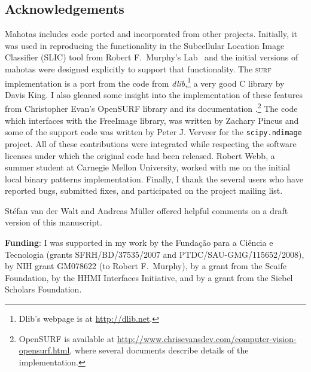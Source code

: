 \documentclass{scrartcl}
\newcommand*{\cpp}{{C\nolinebreak[4]\hspace{-.05em}\raisebox{.4ex}{\tiny\textbf{++}}}}
\let\code\texttt
\begin{document}
\subsection*{Acknowledgements}

Mahotas includes code ported and incorporated from other projects. Initially,
it was used in reproducing the functionality in the Subcellular Location Image
Classifier (SLIC) tool from Robert F.\ Murphy's
Lab~\citep{springerlink:10.1007/978-0-387-45524-2_47} and the initial versions
of mahotas were designed explicitly to support that functionality. The
\textsc{surf} implementation is a port from the code from
\textit{dlib},\footnote{Dlib's webpage is at \url{http://dlib.net}.} a very
good \cpp{} library by Davis King. I also gleaned some insight into the
implementation of these features from Christopher Evan's OpenSURF library and
its documentation \citep{evans2009}.\footnote{OpenSURF is available at
\url{http://www.chrisevansdev.com/computer-vision-opensurf.html}, where several
documents describe details of the implementation.} The code which interfaces
with the FreeImage library, was written by Zachary Pincus and some of the
support code was written by Peter J. Verveer for the \code{scipy.ndimage}
project. All of these contributions were integrated while respecting the
software licenses under which the original code had been released. Robert Webb,
a summer student at Carnegie Mellon University, worked with me on the initial
local binary patterns implementation. Finally, I thank the several users who
have reported bugs, submitted fixes, and participated on the project
mailing list.

St\'efan van der Walt and Andreas M\"uller offered helpful comments on a draft
version of this manuscript.

\textbf{Funding}: I was supported in my work by the Funda\c c\~{a}o para a
Ci\^encia e Tecnologia (grants SFRH/BD/37535/2007 and
PTDC/SAU-GMG/115652/2008), by NIH grant GM078622 (to Robert F.\ Murphy), by a
grant from the Scaife Foundation, by the HHMI Interfaces Initiative, and by a
grant from the Siebel Scholars Foundation.


\end{document}
